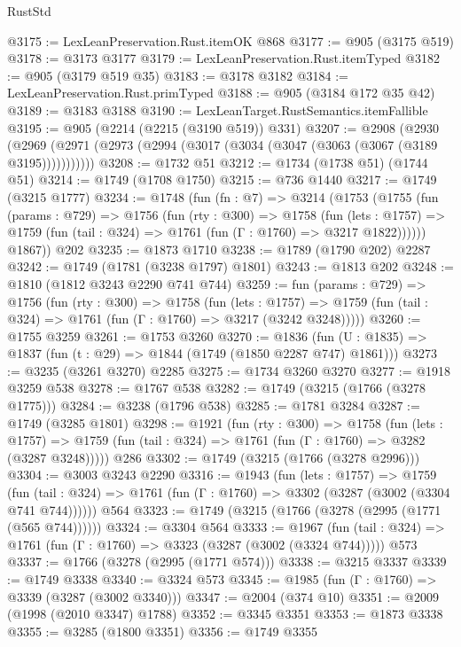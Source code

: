 \begin{lexlean}{RustStd}
\begin{coremodule}
@3175 := LexLeanPreservation.Rust.itemOK @868
@3177 := @905 (@3175 @519)
@3178 := @3173 @3177
@3179 := LexLeanPreservation.Rust.itemTyped
@3182 := @905 (@3179 @519 @35)
@3183 := @3178 @3182
@3184 := LexLeanPreservation.Rust.primTyped
@3188 := @905 (@3184 @172 @35 @42)
@3189 := @3183 @3188
@3190 := LexLeanTarget.RustSemantics.itemFallible
@3195 := @905 (@2214 (@2215 (@3190 @519)) @331)
@3207 := @2908
    (@2930 (@2969 (@2971 (@2973 (@2994 (@3017 (@3034 (@3047 (@3063 (@3067 (@3189 @3195)))))))))))
@3208 := @1732 @51
@3212 := @1734 (@1738 @51) (@1744 @51)
@3214 := @1749 (@1708 @1750)
@3215 := @736 @1440
@3217 := @1749 (@3215 @1777)
@3234 := @1748
    (fun (fn : @7) =>
    @3214
      (@1753
        (@1755
          (fun (params : @729) =>
          @1756
            (fun (rty : @300) =>
            @1758
              (fun (lets : @1757) =>
              @1759 (fun (tail : @324) => @1761 (fun (Γ : @1760) => @3217 @1822))))))
        @1867))
    @202
@3235 := @1873 @1710
@3238 := @1789 (@1790 @202) @2287
@3242 := @1749 (@1781 (@3238 @1797) @1801)
@3243 := @1813 @202
@3248 := @1810 (@1812 @3243 @2290 @741 @744)
@3259 := fun (params : @729) =>
  @1756
    (fun (rty : @300) =>
    @1758
      (fun (lets : @1757) =>
      @1759 (fun (tail : @324) => @1761 (fun (Γ : @1760) => @3217 (@3242 @3248)))))
@3260 := @1755 @3259
@3261 := @1753 @3260
@3270 := @1836 (fun (U : @1835) => @1837 (fun (t : @29) => @1844 (@1749 (@1850 @2287 @747) @1861)))
@3273 := @3235 (@3261 @3270) @2285
@3275 := @1734 @3260 @3270
@3277 := @1918 @3259 @538
@3278 := @1767 @538
@3282 := @1749 (@3215 (@1766 (@3278 @1775)))
@3284 := @3238 (@1796 @538)
@3285 := @1781 @3284
@3287 := @1749 (@3285 @1801)
@3298 := @1921
    (fun (rty : @300) =>
    @1758
      (fun (lets : @1757) =>
      @1759 (fun (tail : @324) => @1761 (fun (Γ : @1760) => @3282 (@3287 @3248)))))
    @286
@3302 := @1749 (@3215 (@1766 (@3278 @2996)))
@3304 := @3003 @3243 @2290
@3316 := @1943
    (fun (lets : @1757) =>
    @1759 (fun (tail : @324) => @1761 (fun (Γ : @1760) => @3302 (@3287 (@3002 (@3304 @741 @744))))))
    @564
@3323 := @1749 (@3215 (@1766 (@3278 (@2995 (@1771 (@565 @744))))))
@3324 := @3304 @564
@3333 := @1967
    (fun (tail : @324) => @1761 (fun (Γ : @1760) => @3323 (@3287 (@3002 (@3324 @744)))))
    @573
@3337 := @1766 (@3278 (@2995 (@1771 @574)))
@3338 := @3215 @3337
@3339 := @1749 @3338
@3340 := @3324 @573
@3345 := @1985 (fun (Γ : @1760) => @3339 (@3287 (@3002 @3340)))
@3347 := @2004 (@374 @10)
@3351 := @2009 (@1998 (@2010 @3347) @1788)
@3352 := @3345 @3351
@3353 := @1873 @3338
@3355 := @3285 (@1800 @3351)
@3356 := @1749 @3355

\end{coremodule}
\end{lexlean}
